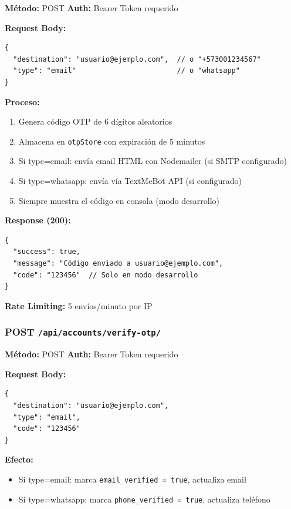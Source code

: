 \documentclass[12pt,a4paper,openany]{article}
\begin{document}
\begin{infobox}
\textbf{Método:} POST \quad \textbf{Auth:} Bearer Token requerido

\textbf{Request Body:}
\begin{lstlisting}[style=jsstyle]
{
  "destination": "usuario@ejemplo.com",  // o "+573001234567"
  "type": "email"                        // o "whatsapp"
}
\end{lstlisting}

\textbf{Proceso:}
\begin{enumerate}
    \item Genera código OTP de 6 dígitos aleatorios
    \item Almacena en \texttt{otpStore} con expiración de 5 minutos
    \item Si type=email: envía email HTML con Nodemailer (si SMTP configurado)
    \item Si type=whatsapp: envía vía TextMeBot API (si configurado)
    \item Siempre muestra el código en consola (modo desarrollo)
\end{enumerate}

\textbf{Response (200):}
\begin{lstlisting}[style=jsstyle]
{
  "success": true,
  "message": "Código enviado a usuario@ejemplo.com",
  "code": "123456"  // Solo en modo desarrollo
}
\end{lstlisting}

\textbf{Rate Limiting:} 5 envíos/minuto por IP
\end{infobox}

\subsubsection{POST \texttt{/api/accounts/verify-otp/}}

\begin{infobox}
\textbf{Método:} POST \quad \textbf{Auth:} Bearer Token requerido

\textbf{Request Body:}
\begin{lstlisting}[style=jsstyle]
{
  "destination": "usuario@ejemplo.com",
  "type": "email",
  "code": "123456"
}
\end{lstlisting}

\textbf{Efecto:}
\begin{itemize}
    \item Si type=email: marca \texttt{email\_verified = true}, actualiza email
    \item Si type=whatsapp: marca \texttt{phone\_verified = true}, actualiza teléfono
\end{itemize}
\end{infobox}
\end{document}
